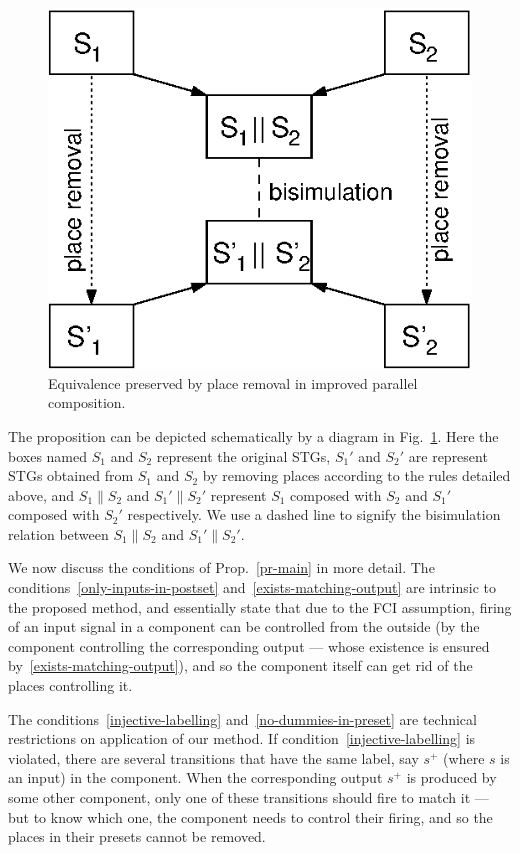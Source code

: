 \begin{figure}[!tb]
  \centering
    \includegraphics[scale=1]{fig/parallel_composition}
  \caption{\label{fi-parcomp-improvement-theorem}
    Equivalence preserved by place removal in improved parallel composition.
  }
\end{figure}

The proposition can be depicted schematically by a diagram in Fig.~\ref{fi-parcomp-improvement-theorem}.
Here the boxes named $S_1$ and $S_2$ represent the original STGs, 
$S_1'$ and $S_2'$ are represent STGs obtained from $S_1$ and $S_2$ by removing places according to
 the rules detailed above, and $S_1 \parallel S_2$ and $S_1' \parallel S_2'$ represent 
$S_1$ composed with $S_2$ and $S_1'$ composed with $S_2'$ respectively. 
We use a dashed line to signify the bisimulation relation between $S_1 \parallel S_2$ and $S_1' \parallel S_2'$.

We now discuss the conditions of Prop.~\ref{pr-main} in more
detail. The conditions~\ref{only-inputs-in-postset}
and~\ref{exists-matching-output} are intrinsic to the proposed
method, and essentially state that due to the FCI assumption,
firing of an input signal in a component can be controlled from
the outside (\viz by the component controlling the
corresponding output --- whose existence is ensured
by~\ref{exists-matching-output}), and so the component itself
can get rid of the places controlling it.

The conditions~\ref{injective-labelling}
and~\ref{no-dummies-in-preset} are technical restrictions on
application of our method. If
condition~\ref{injective-labelling} is violated, there are
several transitions that have the same label, say $s^+$ (where
$s$ is an input) in the component. When the corresponding
output $s^+$ is produced by some other component, only one of
these transitions should fire to match it --- but to know which
one, the component needs to control their firing, and so the
places in their presets cannot be removed.

